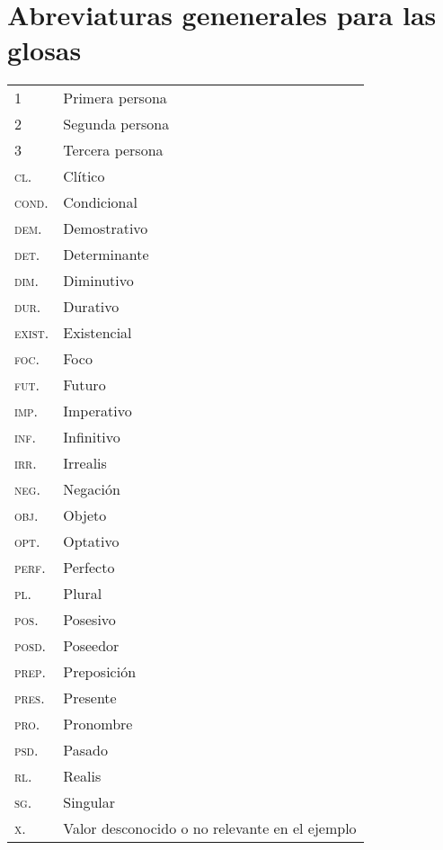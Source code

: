 \section*{Abreviaturas genenerales para las glosas}


\begin{table}[htbp]
      \begin{tabular}{ll}
      1     & Primera persona \\
      2     & Segunda persona \\
      3     & Tercera persona \\
      \textsc{cl}.   & Clítico \\
      \textsc{cond}. & Condicional \\
      \textsc{dem}.  & Demostrativo \\
      \textsc{det}.  & Determinante \\
      \textsc{dim}.  & Diminutivo \\
      \textsc{dur}.  & Durativo \\
      \textsc{exist}. & Existencial \\
      \textsc{foc}.  & Foco \\
      \textsc{fut}.  & Futuro \\
      \textsc{imp}.  & Imperativo \\
      \textsc{inf}.  & Infinitivo \\
      \textsc{irr}.  & Irrealis \\
      \textsc{neg}.  & Negación \\
      \textsc{obj}.  & Objeto \\
      \textsc{opt}.  & Optativo \\
      \textsc{perf}. & Perfecto \\
      \textsc{pl}.   & Plural \\
      \textsc{pos}.  & Posesivo \\
      \textsc{posd}. & Poseedor \\
      \textsc{prep}. & Preposición \\
      \textsc{pres}. & Presente \\
      \textsc{pro}.  & Pronombre \\
      \textsc{psd}.  & Pasado \\
      \textsc{rl}.   & Realis \\
      \textsc{sg}.   & Singular \\
      \textsc{x}.    & Valor desconocido o no relevante en el ejemplo \\
      \end{tabular}%
    \label{glosas}%
  \end{table}